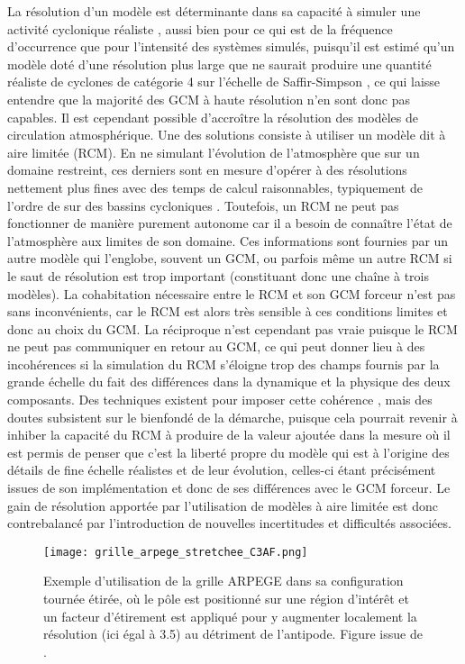 \documentclass[../main.tex]{subfiles}
\begin{document}
La résolution d'un modèle est déterminante dans sa capacité à simuler une activité cyclonique réaliste \parencite{roberts_impact_2020}, aussi bien pour ce qui
est de la fréquence d'occurrence que pour l'intensité des systèmes simulés, puisqu'il est estimé qu'un modèle doté d'une résolution plus large que  ne
saurait produire une quantité réaliste de cyclones de catégorie 4 sur l'échelle de Saffir-Simpson \parencite{davis_resolving_2018}, ce qui laisse entendre que
la majorité des GCM à haute résolution n'en sont donc pas capables. Il est cependant possible d'accroître la résolution des modèles de circulation
atmosphérique. Une des solutions consiste à utiliser un modèle dit à aire limitée (RCM). En ne simulant l'évolution de l'atmosphère que sur un domaine
restreint, ces derniers sont en mesure d'opérer à des résolutions nettement plus fines avec des temps de calcul raisonnables, typiquement de l'ordre de 
sur des bassins cycloniques \parencite{torres-alavez_future_2021}. Toutefois, un RCM ne peut pas fonctionner de manière purement autonome car il a besoin de
connaître l'état de l'atmosphère aux limites de son domaine. Ces informations sont fournies par un autre modèle qui l'englobe, souvent un GCM, ou parfois même
un autre RCM si le saut de résolution est trop important (constituant donc une chaîne à trois modèles). La cohabitation nécessaire entre le RCM et son GCM
forceur n'est pas sans inconvénients, car le RCM est alors très sensible à ces conditions limites \parencite{wu_estimating_2005} et donc au choix du GCM. La
réciproque n'est cependant pas vraie puisque le RCM ne peut pas communiquer en retour au GCM, ce qui peut donner lieu à des incohérences si la simulation du RCM
s'éloigne trop des champs fournis par la grande échelle du fait des différences dans la dynamique et la physique des deux composants. Des techniques existent
pour imposer cette cohérence \parencite{storch_spectral_2000,biner_nesting_2000}, mais des doutes subsistent sur le bienfondé de la démarche, puisque cela
pourrait revenir à inhiber la capacité du RCM à produire de la valeur ajoutée \parencite{alexandru_sensitivity_2009,separovic_impact_2012,omrani_spectral_2012}
dans la mesure où il est permis de penser que c'est la liberté propre du modèle qui est à l'origine des détails de fine échelle réalistes et de leur évolution,
celles-ci étant précisément issues de son implémentation et donc de ses différences avec le GCM forceur. Le gain de résolution apportée par l'utilisation de
modèles à aire limitée est donc contrebalancé par l'introduction de nouvelles incertitudes et difficultés associées.
%
\begin{figure}[tb]
    \centering
    \texttt{[image: grille\_arpege\_stretchee\_C3AF.png]}
    \caption{Exemple d'utilisation de la grille ARPEGE dans sa configuration tournée étirée, où le pôle est positionné sur une région d'intérêt et un facteur
    d'étirement est appliqué pour y augmenter localement la résolution (ici égal à \num{3.5}) au détriment de l'antipode. Figure issue de
    \cite{chauvin_future_2020}.}
    \label{fig:rotated_streched}
\end{figure}
\end{document}
